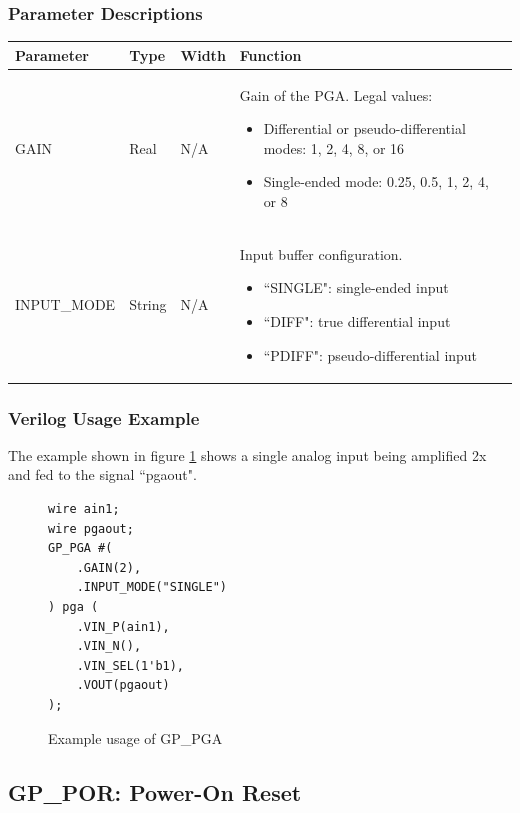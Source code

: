 \documentclass{article}
\begin{document}
\subsubsection{Parameter Descriptions}

\begin{tabularx}{5in}{|l|l|l|X|}
\hline
{\bfseries Parameter} & {\bfseries Type} & {\bfseries Width} & {\bfseries Function} \\
\hline
GAIN & Real & N/A &
	Gain of the PGA. Legal values: 
	
	\begin{itemize}
		\item Differential or pseudo-differential modes: 1, 2, 4, 8, or 16
		\item Single-ended mode: 0.25, 0.5, 1, 2, 4, or 8
	\end{itemize}\\
	
\hline
INPUT\_MODE & String & N/A &
	Input buffer configuration.
	\begin{itemize}
		\item ``SINGLE": single-ended input
		\item ``DIFF": true differential input
		\item ``PDIFF": pseudo-differential input
	\end{itemize}\\
\hline
\end{tabularx}

\pagebreak
\subsubsection{Verilog Usage Example}

The example shown in figure \ref{gp-pga-example} shows a single analog input being amplified 2x and fed to the signal 
``pgaout".

\begin{figure}[h]
\begin{lstlisting}
wire ain1;
wire pgaout;
GP_PGA #(
	.GAIN(2),
	.INPUT_MODE("SINGLE")
) pga (
	.VIN_P(ain1),
	.VIN_N(),
	.VIN_SEL(1'b1),
	.VOUT(pgaout)
);
\end{lstlisting}
\caption{Example usage of GP\_PGA}
\label{gp-pga-example}
\end{figure}


\pagebreak
\clearpage
\subsection{GP\_POR: Power-On Reset}
\end{document}
